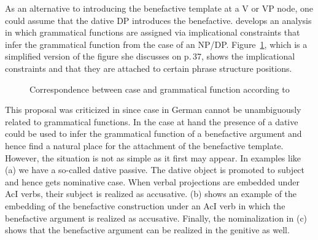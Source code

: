 \label{sec-gf-introduced-by-case}%
As an alternative to introducing the benefactive template at a V or VP node, one could assume that the
dative DP introduces the benefactive. \citet{Berman2003a} develops an analysis in which grammatical functions are assigned via
implicational constraints that infer the grammatical function from the case of an NP/DP. 
Figure~\ref{fig-case-gf-berman}, which is a simplified version of the figure she discusses on
p.\,37, shows the implicational constraints and that they are attached to certain phrase structure positions.
\begin{figure}
{}
\caption{Correspondence between case and grammatical function according to \citet[]{Berman2003a}}\label{fig-case-gf-berman}
\end{figure}%
This proposal was criticized in \citet[Section~7.4]{MuellerGT-Eng1} since case in German cannot be unambiguously related to
grammatical functions. In the case at hand the presence of a dative could be used to infer the
grammatical function of a benefactive argument and hence find a natural place for the attachment of
the benefactive template. However, the situation is not as simple as it first
may appear. In examples like (a) we have a so-called dative passive. The dative object is
promoted to subject and hence gets nominative case. When verbal projections are embedded under AcI verbs,
their subject is realized as accusative. (b) shows an example of the embedding of the
benefactive construction under an AcI verb in which the benefactive argument is realized as
accusative. Finally, the nominalization in (c) shows that the benefactive argument can be
realized in the genitive as well.
\eal
\label{ex-benefactive-in-differentcases}
